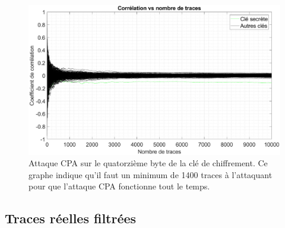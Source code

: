 \documentclass[oneside]{book}
\begin{document}
\begin{figure}[htbp]
    \hspace{-2.8cm}
    \includegraphics[scale=0.65]{image/real_result_corr_vs_nb_traces_CPA}
    \caption{Attaque CPA sur le quatorzième byte de la clé de chiffrement. Ce graphe indique qu'il faut un minimum de 1400 traces à l'attaquant pour que l'attaque CPA fonctionne tout le temps.}
    \label{fig:real_result_corr_vs_nb_traces_CPA} 
\end{figure}

\newpage

\subsection{Traces réelles filtrées}
\label{sec:filter}
\end{document}

